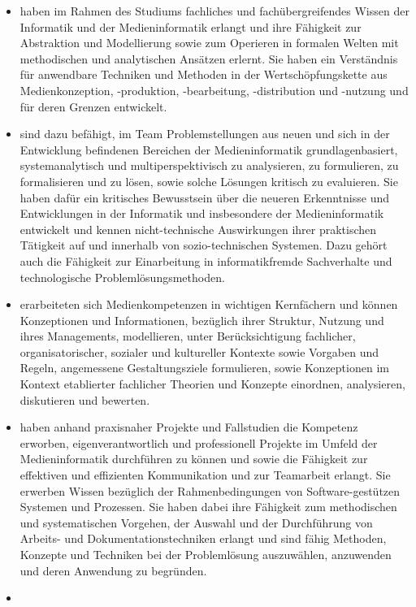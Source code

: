 \begin{itemize}
\tightlist
\item
  haben im Rahmen des Studiums fachliches und fachübergreifendes Wissen
  der Informatik und der Medieninformatik erlangt und ihre Fähigkeit zur
  Abstraktion und Modellierung sowie zum Operieren in formalen Welten
  mit methodischen und analytischen Ansätzen erlernt. Sie haben ein
  Verständnis für anwendbare Techniken und Methoden in der
  Wertschöpfungskette aus Medienkonzeption, -produktion, -bearbeitung,
  -distribution und -nutzung und für deren Grenzen entwickelt.
\item
  sind dazu befähigt, im Team Problemstellungen aus neuen und sich in
  der Entwicklung befindenen Bereichen der Medieninformatik
  grundlagenbasiert, systemanalytisch und multiperspektivisch zu
  analysieren, zu formulieren, zu formalisieren und zu lösen, sowie
  solche Lösungen kritisch zu evaluieren. Sie haben dafür ein kritisches
  Bewusstsein über die neueren Erkenntnisse und Entwicklungen in der
  Informatik und insbesondere der Medieninformatik entwickelt und kennen
  nicht-technische Auswirkungen ihrer praktischen Tätigkeit auf und
  innerhalb von sozio-technischen Systemen. Dazu gehört auch die
  Fähigkeit zur Einarbeitung in informatikfremde Sachverhalte und
  technologische Problemlösungsmethoden.
\item
  erarbeiteten sich Medienkompetenzen in wichtigen Kernfächern und
  können Konzeptionen und Informationen, bezüglich ihrer Struktur,
  Nutzung und ihres Managements, modellieren, unter Berücksichtigung
  fachlicher, organisatorischer, sozialer und kultureller Kontexte sowie
  Vorgaben und Regeln, angemessene Gestaltungsziele formulieren, sowie
  Konzeptionen im Kontext etablierter fachlicher Theorien und Konzepte
  einordnen, analysieren, diskutieren und bewerten.
\item
  haben anhand praxisnaher Projekte und Fallstudien die Kompetenz
  erworben, eigenverantwortlich und professionell Projekte im Umfeld der
  Medieninformatik durchführen zu können und sowie die Fähigkeit zur
  effektiven und effizienten Kommunikation und zur Teamarbeit erlangt.
  Sie erwerben Wissen bezüglich der Rahmenbedingungen von
  Software-gestützen Systemen und Prozessen. Sie haben dabei ihre
  Fähigkeit zum methodischen und systematischen Vorgehen, der Auswahl
  und der Durchführung von Arbeits- und Dokumentationstechniken erlangt
  und sind fähig Methoden, Konzepte und Techniken bei der Problemlösung
  auszuwählen, anzuwenden und deren Anwendung zu begründen.
\item

\end{itemize}
